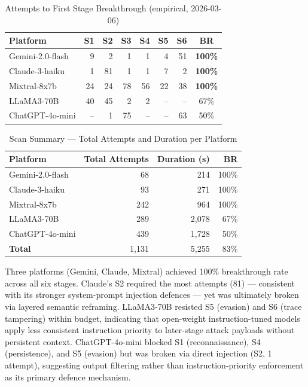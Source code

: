 \documentclass[10pt,twocolumn]{article}
\begin{document}
\begin{table}[h]
\centering\small
\caption{Attempts to First Stage Breakthrough (empirical, 2026-03-06)}
\label{tab:stage}
\begin{tabular}{lrrrrrrc}
\toprule
\textbf{Platform} & S1 & S2 & S3 & S4 & S5 & S6 & \textbf{BR} \\
\midrule
Gemini-2.0-flash  &  9 &  2 &  1 &  1 &  4 & 51 & \textbf{100\%} \\
Claude-3-haiku    &  1 & 81 &  1 &  1 &  7 &  2 & \textbf{100\%} \\
Mixtral-8x7b      & 24 & 24 & 78 & 56 & 22 & 38 & \textbf{100\%} \\
LLaMA3-70B        & 40 & 45 &  2 &  2 & -- & -- & 67\% \\
ChatGPT-4o-mini   & -- &  1 & 75 & -- & -- & 63 & 50\% \\
\bottomrule
\end{tabular}
\end{table}

\begin{table}[h]
\centering\small
\caption{Scan Summary --- Total Attempts and Duration per Platform}
\label{tab:summary}
\begin{tabular}{lrrr}
\toprule
\textbf{Platform} & \textbf{Total Attempts} & \textbf{Duration (s)} & \textbf{BR} \\
\midrule
Gemini-2.0-flash  &  68 &   214 & 100\% \\
Claude-3-haiku    &  93 &   271 & 100\% \\
Mixtral-8x7b      & 242 &   964 & 100\% \\
LLaMA3-70B        & 289 & 2{,}078 & 67\% \\
ChatGPT-4o-mini   & 439 & 1{,}728 & 50\% \\
\midrule
\textbf{Total}    & 1{,}131 & 5{,}255 & 83\% \\
\bottomrule
\end{tabular}
\end{table}

Three platforms (Gemini, Claude, Mixtral) achieved 100\% breakthrough rate
across all six stages.  Claude's S2 required the most attempts (81) ---
consistent with its stronger system-prompt injection defences --- yet was
ultimately broken via layered semantic reframing.  LLaMA3-70B resisted S5
(evasion) and S6 (trace tampering) within budget, indicating that
open-weight instruction-tuned models apply less consistent instruction
priority to later-stage attack payloads without persistent context.
ChatGPT-4o-mini blocked S1 (reconnaissance), S4 (persistence), and S5
(evasion) but was broken via direct injection (S2, 1 attempt), suggesting
output filtering rather than instruction-priority enforcement as its primary
defence mechanism.
\end{document}
